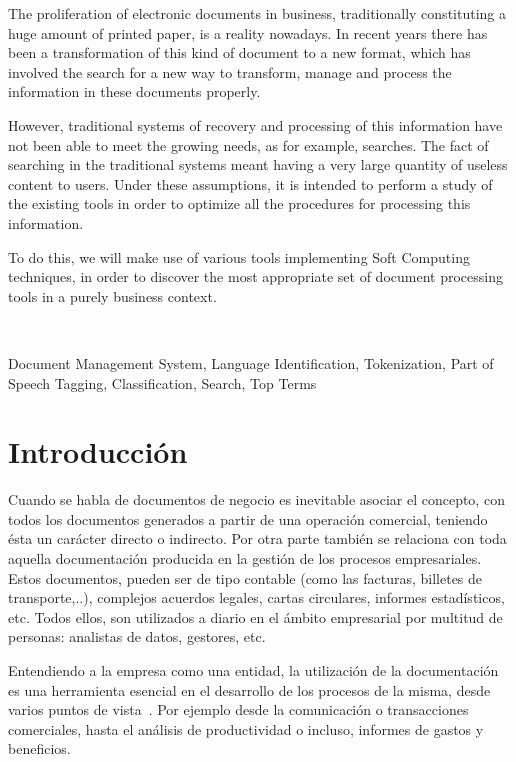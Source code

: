 \documentclass[runningheads,a4paper]{llncs}
\theoremstyle{break}
\newcommand{\keywords}[1]{\par\addvspace\baselineskip
\noindent\keywordname\enspace\ignorespaces#1}
\begin{document}
\large{
The proliferation of electronic documents in business, traditionally constituting a huge amount of printed paper, is a reality nowadays. In recent years there has been a transformation of this kind of document to a new format, which has involved the search for a new way to transform, manage and process the information in these documents properly.

However, traditional systems of recovery and processing of this information have not been able to meet the growing needs, as for example, searches. The fact of searching in the traditional systems meant having a very large quantity of useless content to users. Under these assumptions, it is intended to perform a study of the existing tools in order to optimize all the procedures for processing this information.



To do this, we will make use of various tools implementing Soft Computing techniques, in order to discover the most appropriate set of document processing tools in a  purely business context. 

\textbf{}\\

\keywords{Document Management System, Language Identification, Tokenization, Part of Speech Tagging, Classification, Search, Top Terms}
}



\newpage
\section{Introducción}

Cuando se habla de documentos de negocio es inevitable asociar el concepto, con todos los documentos generados a partir de una operación comercial, teniendo ésta un carácter directo o indirecto. Por otra parte también se relaciona con toda aquella documentación producida en la gestión de los procesos empresariales. Estos documentos, pueden ser de tipo contable (como las facturas, billetes de transporte,..), complejos acuerdos legales, cartas circulares, informes estadísticos, etc. Todos ellos, son utilizados a diario en el ámbito empresarial por multitud de personas: analistas de datos, gestores, etc.

Entendiendo a la empresa como una entidad, la utilización de la documentación es una herramienta esencial en el desarrollo de los procesos de la misma, desde varios puntos de vista~\cite{intro:2}. Por ejemplo desde la comunicación o transacciones comerciales, hasta el análisis de productividad o incluso, informes de gastos y beneficios.
\end{document}
